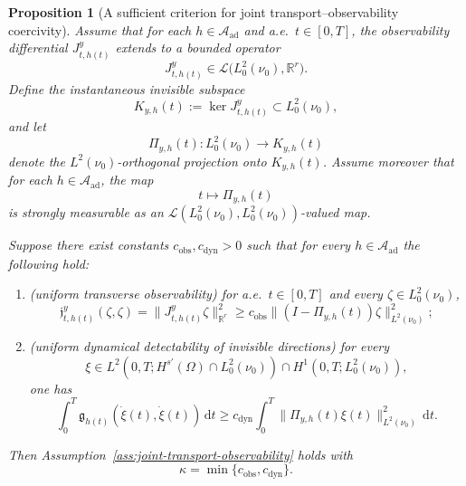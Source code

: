 \documentclass{article}
\newtheorem{proposition}[theorem]{Proposition}
\theoremstyle{definition}
\renewcommand{\d}{\mathrm{d}}
\begin{document}
\begin{proposition}[A sufficient criterion for joint transport--observability coercivity]
    \label{prop:kernel-decomposition-criterion}
    Assume that for each \(h\in \mathcal A_{\mathrm{ad}}\) and a.e.\ \(t\in[0,T]\), the observability
    differential \(J_{t,h(t)}^{y}\) extends to a bounded operator
    \[
        J_{t,h(t)}^{y}\in \mathcal L\bigl(L^2_0(\nu_0),\mathbb R^r\bigr).
    \]
    Define the instantaneous invisible subspace
    \[
        K_{y,h}(t):=\ker J_{t,h(t)}^{y}\subset L^2_0(\nu_0),
    \]
    and let
    \[
        \Pi_{y,h}(t):L^2_0(\nu_0)\to K_{y,h}(t)
    \]
    denote the \(L^2(\nu_0)\)-orthogonal projection onto \(K_{y,h}(t)\). Assume moreover that for
    each \(h\in \mathcal A_{\mathrm{ad}}\), the map
    \[
        t\longmapsto \Pi_{y,h}(t)
    \]
    is strongly measurable as an \(\mathcal L(L^2_0(\nu_0),L^2_0(\nu_0))\)-valued map.

    Suppose there exist constants \(c_{\mathrm{obs}},c_{\mathrm{dyn}}>0\) such that for every
    \(h\in \mathcal A_{\mathrm{ad}}\) the following hold:

    \begin{enumerate}
        \item[(i)] (\emph{uniform transverse observability}) for a.e.\ \(t\in[0,T]\) and every
              \(\zeta\in L^2_0(\nu_0)\),
              \begin{equation}
                  \label{eq:transverse-observability}
                  \mathfrak j_{t,h(t)}^{y}(\zeta,\zeta)
                  =
                  \|J_{t,h(t)}^{y}\zeta\|_{\mathbb R^r}^2
                  \ge
                  c_{\mathrm{obs}}
                  \bigl\|(I-\Pi_{y,h}(t))\zeta\bigr\|_{L^2(\nu_0)}^2;
              \end{equation}

        \item[(ii)] (\emph{uniform dynamical detectability of invisible directions}) for every
              \[
                  \xi\in L^2(0,T;H^{s'}(\Omega)\cap L^2_0(\nu_0))
                  \cap H^1(0,T;L^2_0(\nu_0)),
              \]
              one has
              \begin{equation}
                  \label{eq:dynamical-detectability}
                  \int_0^T \mathfrak g_{h(t)}(\dot\xi(t),\dot\xi(t))\,\d t
                  \ge
                  c_{\mathrm{dyn}}
                  \int_0^T
                  \bigl\|\Pi_{y,h}(t)\xi(t)\bigr\|_{L^2(\nu_0)}^2\,\d t.
              \end{equation}
    \end{enumerate}

    Then Assumption~\ref{ass:joint-transport-observability} holds with
    \[
        \kappa=\min\{c_{\mathrm{obs}},c_{\mathrm{dyn}}\}.
    \]
\end{proposition}
\end{document}
